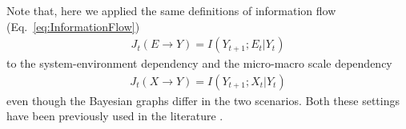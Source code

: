 \documentclass[utf8]{article}
\newtheorem{definition}{Definition}
\newcommand{\X}{\mathcal{X}}
\newcommand{\E}{\mathcal{E}}
\DeclareMathOperator*{\argmax}{arg\,max}
\begin{document}
                               
        \noindent Note that, here we applied the same definitions of information flow (Eq.~\ref{eq:InformationFlow})
        \begin{align}
            J_{t}(E \rightarrow Y )=I(Y_{t+1};E_t|Y_t)
        \end{align}
            to the system-environment dependency
            and the micro-macro scale dependency
        \begin{align}
            J_{t}(X \rightarrow Y )=I(Y_{t+1};X_t|Y_t)
        \end{align}
        even though the Bayesian graphs differ in the two scenarios. Both these settings have been previously used in the literature \citep[see][]{BERTSCHINGER.2006, PFANTE.2014}.\\
        
\end{document}
